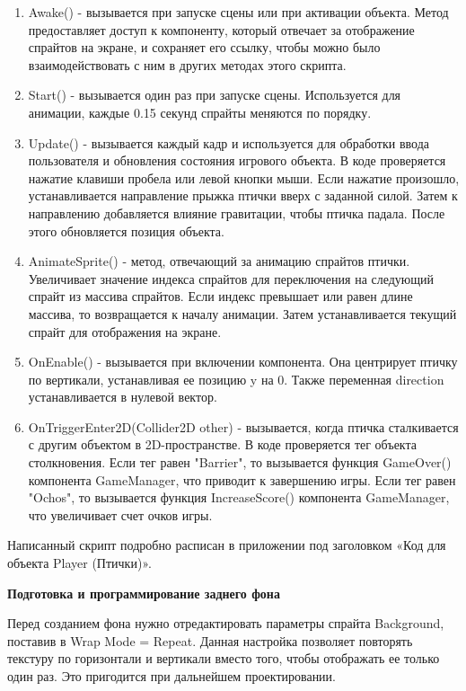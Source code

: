 \documentclass[14pt, oneside]{altsu-report}
\begin{document}
\begin{enumerate}
\item Awake() - вызывается при запуске сцены или при активации объекта. Метод предоставляет доступ к компоненту, который отвечает за отображение спрайтов на экране, и сохраняет его ссылку, чтобы можно было взаимодействовать с ним в других методах этого скрипта.
\item Start() - вызывается один раз при запуске сцены. Используется для анимации, каждые 0.15 секунд спрайты меняются по порядку.
\item Update() - вызывается каждый кадр и используется для обработки ввода пользователя и обновления состояния игрового объекта. В коде проверяется нажатие клавиши пробела или левой кнопки мыши. Если нажатие произошло, устанавливается направление прыжка птички вверх с заданной силой. Затем к направлению добавляется влияние гравитации, чтобы птичка падала. После этого обновляется позиция объекта.
\item AnimateSprite() - метод, отвечающий за анимацию спрайтов птички. Увеличивает значение индекса спрайтов для переключения на следующий спрайт из массива спрайтов. Если индекс превышает или равен длине массива, то возвращается к началу анимации. Затем устанавливается текущий спрайт для отображения на экране.
\item OnEnable() - вызывается при включении компонента. Она центрирует птичку по вертикали, устанавливая ее позицию y на 0. Также переменная direction устанавливается в нулевой вектор.
\item OnTriggerEnter2D(Collider2D other) - вызывается, когда птичка сталкивается с другим объектом в 2D-пространстве. В коде проверяется тег объекта столкновения. Если тег равен "Barrier", то вызывается функция GameOver() компонента GameManager, что приводит к завершению игры. Если тег равен "Ochos", то вызывается функция IncreaseScore() компонента GameManager, что увеличивает счет очков игры.
\end{enumerate} 

Написанный скрипт подробно расписан в приложении под заголовком «Код для объекта Player (Птички)».

\textbf{Подготовка и программирование заднего фона}

Перед созданием фона нужно отредактировать параметры спрайта Background, поставив в Wrap Mode = Repeat. Данная настройка позволяет повторять текстуру по горизонтали и вертикали вместо того, чтобы отображать ее только один раз. Это пригодится при дальнейшем проектировании.
\end{document}
